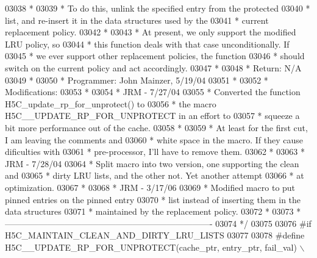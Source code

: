 \begin{DoxyCode}
03038 \textcolor{comment}{ *}
03039 \textcolor{comment}{ *      To do this, unlink the specified entry from the protected}
03040 \textcolor{comment}{ *      list, and re-insert it in the data structures used by the}
03041 \textcolor{comment}{ *      current replacement policy.}
03042 \textcolor{comment}{ *}
03043 \textcolor{comment}{ *      At present, we only support the modified LRU policy, so}
03044 \textcolor{comment}{ *      this function deals with that case unconditionally.  If}
03045 \textcolor{comment}{ *      we ever support other replacement policies, the function}
03046 \textcolor{comment}{ *      should switch on the current policy and act accordingly.}
03047 \textcolor{comment}{ *}
03048 \textcolor{comment}{ * Return:      N/A}
03049 \textcolor{comment}{ *}
03050 \textcolor{comment}{ * Programmer:  John Mainzer, 5/19/04}
03051 \textcolor{comment}{ *}
03052 \textcolor{comment}{ * Modifications:}
03053 \textcolor{comment}{ *}
03054 \textcolor{comment}{ *      JRM - 7/27/04}
03055 \textcolor{comment}{ *      Converted the function H5C\_update\_rp\_for\_unprotect() to}
03056 \textcolor{comment}{ *      the macro H5C\_\_UPDATE\_RP\_FOR\_UNPROTECT in an effort to}
03057 \textcolor{comment}{ *      squeeze a bit more performance out of the cache.}
03058 \textcolor{comment}{ *}
03059 \textcolor{comment}{ *      At least for the first cut, I am leaving the comments and}
03060 \textcolor{comment}{ *      white space in the macro.  If they cause dificulties with}
03061 \textcolor{comment}{ *      pre-processor, I'll have to remove them.}
03062 \textcolor{comment}{ *}
03063 \textcolor{comment}{ *      JRM - 7/28/04}
03064 \textcolor{comment}{ *      Split macro into two version, one supporting the clean and}
03065 \textcolor{comment}{ *      dirty LRU lists, and the other not.  Yet another attempt}
03066 \textcolor{comment}{ *      at optimization.}
03067 \textcolor{comment}{ *}
03068 \textcolor{comment}{ *      JRM - 3/17/06}
03069 \textcolor{comment}{ *      Modified macro to put pinned entries on the pinned entry}
03070 \textcolor{comment}{ *      list instead of inserting them in the data structures}
03071 \textcolor{comment}{ *      maintained by the replacement policy.}
03072 \textcolor{comment}{ *}
03073 \textcolor{comment}{ *-------------------------------------------------------------------------}
03074 \textcolor{comment}{ */}
03075 
03076 \textcolor{preprocessor}{#if H5C\_MAINTAIN\_CLEAN\_AND\_DIRTY\_LRU\_LISTS}
03077 
03078 \textcolor{preprocessor}{#define H5C\_\_UPDATE\_RP\_FOR\_UNPROTECT(cache\_ptr, entry\_ptr, fail\_val)       \(\backslash\)}

\end{DoxyCode}
